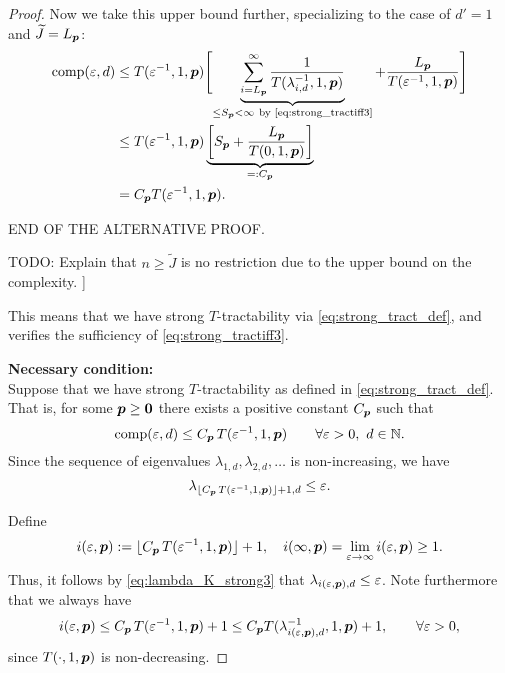 \documentclass[11pt,a4paper]{article}
\begin{document}
\begin{proof}
{Now we take this upper bound further, specializing to the case of $d'=1$ and $\widetilde{J}=L_{\boldsymbol{p}}$:
\begin{align*}
       \operatorname{comp}(\varepsilon,d)
       & \le T(\varepsilon^{-1},1, \boldsymbol{p}) \Biggl [ \underbrace{\sum_{i=L_{\boldsymbol{p}}}^\infty \frac{1}{T(\lambda_{i, d}^{-1},1,\boldsymbol{p})}}_{\le S_{\boldsymbol{p}} <\infty\ \text{by \eqref{eq:strong_tractiff3}} }
       + \frac{L_{\boldsymbol{p}}}{T(\varepsilon^{-1},1, \boldsymbol{p})} \Biggr] \\
       & \le T(\varepsilon^{-1},1,\boldsymbol{p}) \underbrace{\left[S_{\boldsymbol{p}} + \frac{L_{\boldsymbol{p}}}{T(0,1, \boldsymbol{p})}\right]}_{=:C_{\boldsymbol{p}}}\\
       & =  C_{\boldsymbol{p}}T(\varepsilon^{-1},1,\boldsymbol{p}).
\end{align*}

\bigskip 

END OF THE ALTERNATIVE PROOF.

TODO: Explain that $n\ge \widetilde{J}$ is no restriction due to the upper bound on the complexity.
]
 

}

This means that we have strong $T$-tractability via \eqref{eq:strong_tract_def}, and verifies the sufficiency of \eqref{eq:strong_tractiff3}.



\bigskip
\noindent \textbf{Necessary condition:} \\
Suppose that we have strong
$T$-tractability as defined in \eqref{eq:strong_tract_def}. That is, for some $\boldsymbol{p} \ge \boldsymbol{0}$ there exists a positive constant $C_{\boldsymbol{p}}$ such that
\[
\operatorname{comp}(\varepsilon,d)\le C_{\boldsymbol{p}}\, T(\varepsilon^{-1},1,\boldsymbol{p})
\qquad \forall \varepsilon > 0, \ d \in \mathbb{N}.
\]
Since the sequence of eigenvalues $\lambda_{1,d}, \lambda_{2,d}, \ldots $ is non-increasing, we have
\begin{equation}\label{eq:lambda_K_strong3}
\lambda_{\lfloor C_{\boldsymbol{p}}\, T(\varepsilon^{-1},1,\boldsymbol{p})\rfloor +1,d}\le \varepsilon.
\end{equation}

Define
\[
i(\varepsilon,\boldsymbol{p}):= \lfloor C_{\boldsymbol{p}}\, T(\varepsilon^{-1},1,\boldsymbol{p})\rfloor +1, \quad
i(\infty,\boldsymbol{p}) = \lim_{\varepsilon \to \infty}  i(\varepsilon,\boldsymbol{p}) \ge 1 .
\]
Thus, it follows by \eqref{eq:lambda_K_strong3} that $\lambda_{i(\varepsilon,\boldsymbol{p}),d} \le \varepsilon$.
Note furthermore that we always have
\[
i(\varepsilon,\boldsymbol{p})\le C_{\boldsymbol{p}}\, T(\varepsilon^{-1},1,\boldsymbol{p})+1 \le C_{\boldsymbol{p}} T(\lambda_{i(\varepsilon,\boldsymbol{p}),d}^{-1},1,\boldsymbol{p})+1, \qquad \forall \varepsilon > 0,
\]
since
$T(\cdot,1, \boldsymbol{p})$ is non-decreasing.


\end{proof}
\end{document}
